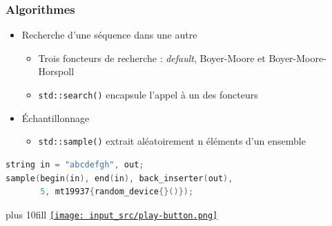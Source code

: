 \documentclass[C++.tex]{subfiles}
\begin{document}
\begin{frame}[fragile]
	\frametitle{Algorithmes}
	\begin{itemize}
		\item Recherche d'une séquence dans une autre
		\begin{itemize}
			\item Trois foncteurs de recherche : \textit{default}, Boyer-Moore et Boyer-Moore-Horspoll
			\item \lstinline|std::search()| encapsule l'appel à un des foncteurs
		\end{itemize}
		\item Échantillonnage
		\begin{itemize}
			\item \lstinline|std::sample()| extrait aléatoirement n éléments d'un ensemble
		\end{itemize}
	\end{itemize}

	\begin{lstlisting}[language=C++]
string in = "abcdefgh", out;
sample(begin(in), end(in), back_inserter(out), 
       5, mt19937{random_device{}()});\end{lstlisting}

	\vskip 10mm plus 10fill
	\hfill
	\href{https://godbolt.org/#g:!((g:!((g:!((h:codeEditor,i:(filename:'1',fontScale:14,fontUsePx:'0',j:1,lang:c%2B%2B,selection:(endColumn:1,endLineNumber:20,positionColumn:1,positionLineNumber:20,selectionStartColumn:1,selectionStartLineNumber:20,startColumn:1,startLineNumber:20),source:'%23include+%3Ciostream%3E%0A%23include+%3Cstring%3E%0A%23include+%3Calgorithm%3E%0A%23include+%3Crandom%3E%0A%23include+%3Cctime%3E%0A%0Aint+main()%0A%7B%0A++std::string+in+%3D+%22abcdefgh%22%3B%0A++std::string+out%3B%0A++std::mt19937+gen%7Bstatic_cast%3Cunsigned+long%3E(time(nullptr))%7D%3B%0A++std::sample(std::begin(in),+std::end(in),+std::back_inserter(out),+5,+gen)%3B%0A%0A++for(auto+it+:+out)%0A++%7B%0A++++std::cout+%3C%3C+it+%3C%3C+!'+!'%3B%0A++%7D%0A++std::cout+%3C%3C+!'%5Cn!'%3B%0A%7D%0A'),l:'5',n:'0',o:'C%2B%2B+source+%231',t:'0')),k:50,l:'4',n:'0',o:'',s:0,t:'0'),(g:!((h:executor,i:(argsPanelShown:'1',compilationPanelShown:'0',compiler:g112,compilerOutShown:'0',execArgs:'',execStdin:'',fontScale:14,fontUsePx:'0',j:1,lang:c%2B%2B,libs:!((name:boost,ver:'175')),options:'-std%3Dc%2B%2B17+-Wall+-Wextra',source:1,stdinPanelShown:'1',tree:'1',wrap:'0'),l:'5',n:'0',o:'Executor+x86-64+gcc+11.2+(C%2B%2B,+Editor+%231)',t:'0')),header:(),k:50,l:'4',n:'0',o:'',s:0,t:'0')),l:'2',n:'0',o:'',t:'0')),version:4}{\texttt{[image: input\_src/play-button.png]}}
\end{frame}
\end{document}
